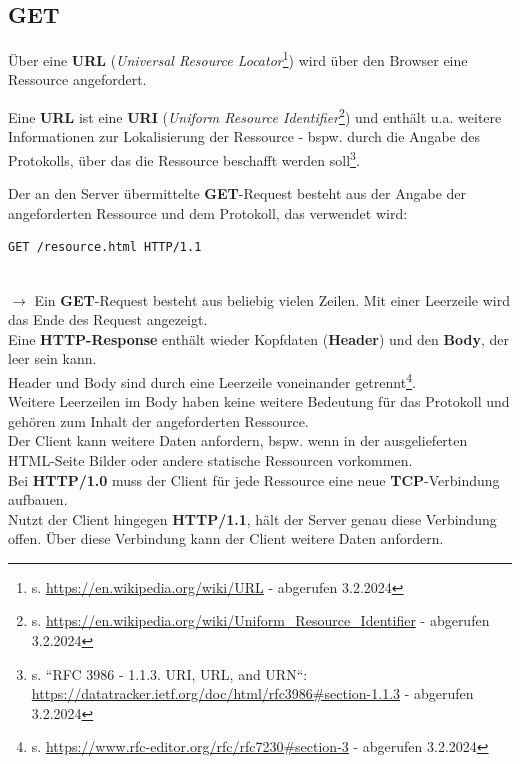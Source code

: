 \subsection{GET}

Über eine \textbf{URL} (\textit{Universal Resource Locator}\footnote{
s. \url{https://en.wikipedia.org/wiki/URL} - abgerufen 3.2.2024
}) wird über den Browser eine Ressource angefordert.

\begin{tcolorbox}[enlarge top by=0.5cm,enlarge bottom by=0.5cm]
    Eine \textbf{URL} ist eine \textbf{URI} (\textit{Uniform Resource Identifier}\footnote{
        s. \url{https://en.wikipedia.org/wiki/Uniform_Resource_Identifier} - abgerufen 3.2.2024
    }) und enthält u.a. weitere Informationen zur Lokalisierung der Ressource - bspw. durch die Angabe des Protokolls, über das die Ressource beschafft werden soll\footnote{s. ``RFC 3986 - 1.1.3.  URI, URL, and URN``: \url{https://datatracker.ietf.org/doc/html/rfc3986#section-1.1.3} - abgerufen 3.2.2024}.
\end{tcolorbox}

\noindent
Der an den Server übermittelte \textbf{GET}-Request besteht aus der Angabe der angeforderten Ressource und dem Protokoll, das verwendet wird:

\begin{verbatim}
GET /resource.html HTTP/1.1
\end{verbatim}
\\

$\rightarrow$ Ein \textbf{GET}-Request besteht aus beliebig vielen Zeilen.
Mit einer Leerzeile wird das Ende des Request angezeigt.\\

\noindent
Eine \textbf{HTTP-Response} enthält wieder Kopfdaten (\textbf{Header}) und den \textbf{Body}, der leer sein kann.\\
Header und Body sind durch eine Leerzeile voneinander getrennt\footnote{
    s. \url{https://www.rfc-editor.org/rfc/rfc7230#section-3} - abgerufen 3.2.2024
}.\\
Weitere Leerzeilen im Body haben keine weitere Bedeutung für das Protokoll und gehören zum Inhalt der angeforderten Ressource.\\

\noindent
Der Client kann weitere Daten anfordern, bspw. wenn in der ausgelieferten HTML-Seite Bilder oder andere statische Ressourcen vorkommen.\\
Bei \textbf{HTTP/1.0} muss der Client für jede Ressource eine neue \textbf{TCP}-Verbindung aufbauen.\\
Nutzt der Client hingegen \textbf{HTTP/1.1}, hält der Server genau diese Verbindung offen.
Über diese Verbindung kann der Client weitere Daten anfordern.


